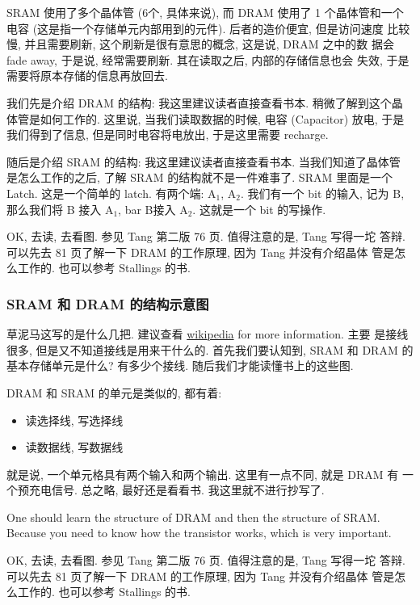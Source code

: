 \documentclass[11pt]{article}
\begin{document}
SRAM 使用了多个晶体管 (6个, 具体来说), 而 DRAM 使用了 1 个晶体管和一个
电容 (这是指一个存储单元内部用到的元件). 后者的造价便宜, 但是访问速度
比较慢, 并且需要刷新, 这个刷新是很有意思的概念, 这是说, DRAM 之中的数
据会 fade away, 于是说, 经常需要刷新. 其在读取之后, 内部的存储信息也会
失效, 于是需要将原本存储的信息再放回去.

我们先是介绍 DRAM 的结构: 我这里建议读者直接查看书本. 稍微了解到这个晶
体管是如何工作的. 这里说, 当我们读取数据的时候, 电容 (Capacitor) 放电,
于是我们得到了信息, 但是同时电容将电放出, 于是这里需要 recharge.

随后是介绍 SRAM 的结构: 我这里建议读者直接查看书本. 当我们知道了晶体管
是怎么工作的之后, 了解 SRAM 的结构就不是一件难事了. SRAM 里面是一个
Latch. 这是一个简单的 latch. 有两个端: A\(_{\text{1}}\), A\(_{\text{2}}\). 我们有一个 bit 的输入,
记为 B, 那么我们将 B 接入 A\(_{\text{1}}\), bar B接入 A\(_{\text{2}}\). 这就是一个 bit 的写操作.

OK, 去读, 去看图. 参见 Tang 第二版 76 页. 值得注意的是, Tang 写得一坨
答辩. 可以先去 81 页了解一下 DRAM 的工作原理, 因为 Tang 并没有介绍晶体
管是怎么工作的. 也可以参考 Stallings 的书.

\subsubsection{SRAM 和 DRAM 的结构示意图}
\label{sec:org10814ef}

草泥马这写的是什么几把. 建议查看 \href{https:en.wikipedia.org/wiki/Dynamic\_random-access\_memory}{wikipedia} for more information. 主要
是接线很多, 但是又不知道接线是用来干什么的. 首先我们要认知到, SRAM 和
DRAM 的基本存储单元是什么? 有多少个接线. 随后我们才能读懂书上的这些图.

DRAM 和 SRAM 的单元是类似的, 都有着: 
\begin{itemize}
\item 读选择线, 写选择线
\item 读数据线, 写数据线
\end{itemize}
就是说, 一个单元格具有两个输入和两个输出. 这里有一点不同, 就是 DRAM 有
一个预充电信号. 
总之略, 最好还是看看书. 我这里就不进行抄写了.

One should learn the structure of DRAM and then the structure of SRAM. Because you need to know how the transistor works, which is very important.

OK, 去读, 去看图. 参见 Tang 第二版 76 页. 值得注意的是, Tang 写得一坨
答辩. 可以先去 81 页了解一下 DRAM 的工作原理, 因为 Tang 并没有介绍晶体
管是怎么工作的. 也可以参考 Stallings 的书.
\end{document}
